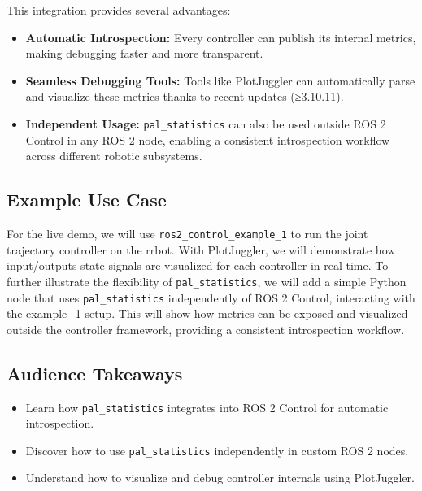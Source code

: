 \documentclass[11pt,a4paper]{article}
\begin{document}
This integration provides several advantages:
\begin{itemize}
    \item \textbf{Automatic Introspection:} Every controller can publish its
          internal metrics, making debugging faster and more transparent.
    \item \textbf{Seamless Debugging Tools:} Tools like PlotJuggler can
          automatically parse and visualize these metrics thanks to recent
          updates (≥3.10.11).
    \item \textbf{Independent Usage:} \texttt{pal\_statistics} can also be used
          outside ROS 2 Control in any ROS 2 node, enabling a consistent
          introspection workflow across different robotic subsystems.
\end{itemize}

\subsection*{Example Use Case}

For the live demo, we will use \texttt{ros2\_control\_example\_1} to run the joint
trajectory controller on the rrbot. With PlotJuggler, we will demonstrate how
input/outputs state signals are visualized for each controller in real time.
To further illustrate
the flexibility of \texttt{pal\_statistics}, we will add a simple Python node that
uses \texttt{pal\_statistics} independently of ROS 2 Control, interacting with the
example\_1 setup. This will show how metrics can be exposed and visualized outside
the controller framework, providing a consistent introspection workflow.

\subsection*{Audience Takeaways}
\begin{itemize}
    \item Learn how \texttt{pal\_statistics} integrates into ROS 2 Control for
          automatic introspection.
    \item Discover how to use \texttt{pal\_statistics} independently in custom
          ROS 2 nodes.
    \item Understand how to visualize and debug controller internals using
          PlotJuggler.
\end{itemize}
\end{document}
